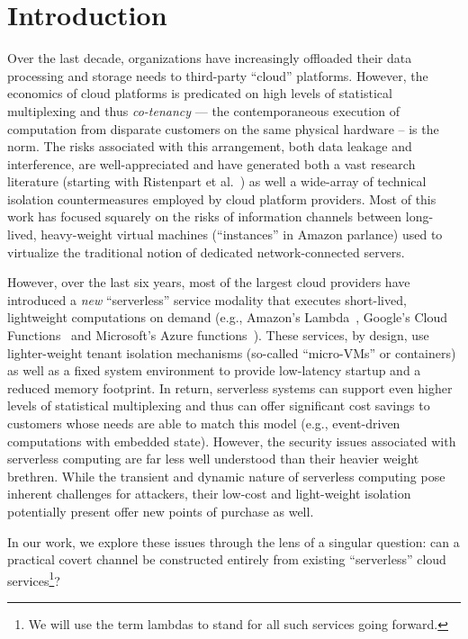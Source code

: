 \section{Introduction}
\label{sec:intro}

Over the last decade, organizations have increasingly offloaded their
data processing and storage needs to third-party ``cloud'' platforms.
However, the economics of cloud platforms is predicated on high levels
of statistical multiplexing and thus \emph{co-tenancy} --- the
contemporaneous execution of computation from disparate customers on
the same physical hardware -- is the norm.  The risks associated with
this arrangement, both data leakage and interference, are
well-appreciated and have generated both a vast research literature
(starting with Ristenpart et al.~\cite{ristenpartccs2009}) as well a
wide-array of technical isolation countermeasures employed by cloud
platform providers. Most of this work has focused squarely on the risks
of information channels between long-lived, heavy-weight virtual
machines (``instances'' in Amazon parlance) used to virtualize the
traditional notion of dedicated network-connected servers.

However, over the last six years, most of the largest cloud providers have
introduced a \emph{new} ``serverless'' service modality that executes
short-lived, lightweight computations on demand (e.g., Amazon's
Lambda~\cite{awslambda}, Google's Cloud Functions~\cite{gcpfunctions} and
Microsoft's Azure functions~\cite{azurefunctions}).  These services, by design,
use lighter-weight tenant isolation mechanisms (so-called ``micro-VMs'' or
containers) as well as a fixed system environment to provide low-latency startup
and a reduced memory footprint.  In return, serverless systems can support even
higher levels of statistical multiplexing and thus can offer significant cost
savings to customers whose needs are able to match this model (e.g.,
event-driven computations with embedded state).  However, the security issues
associated with serverless computing are far less well understood than their
heavier weight brethren.  While the transient and dynamic nature of serverless
computing pose inherent challenges for attackers, their low-cost and
light-weight isolation potentially present offer new points of purchase as well.

In our work, we explore these issues through the lens of a singular question:
can a practical covert channel be constructed entirely from existing
``serverless'' cloud services\footnote{We will use the term lambdas to 
stand for all such services going forward.}?


